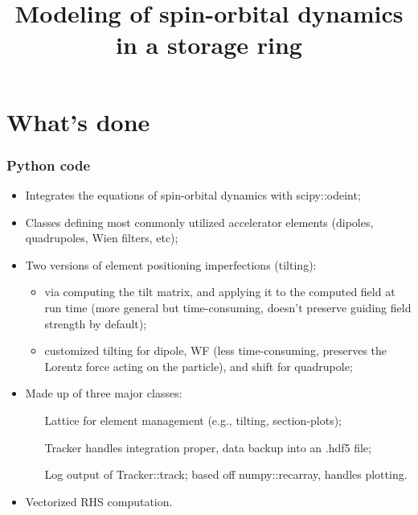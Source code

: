 \documentclass[pdf]{beamer}
\title{Modeling of spin-orbital dynamics in a storage ring}
\begin{document}
	\begin{frame}
		\titlepage
	\end{frame}		
\section{What's done}
	\begin{frame}
		\frametitle{Python code}
		\begin{itemize}
			\item Integrates the equations of spin-orbital dynamics with scipy::odeint;
			\item Classes defining most commonly utilized accelerator elements (dipoles, quadrupoles, Wien filters, etc);
			\item Two versions of element positioning imperfections (tilting):
			\begin{itemize}
				\item via computing the tilt matrix, and applying it to the computed field at run time (more general but time-consuming, doesn't preserve guiding field strength by default);
				\item customized tilting for dipole, WF (less time-consuming, preserves the Lorentz force acting on the particle), and shift for quadrupole;
			\end{itemize}
			\item Made up of three major classes:
			\begin{itemize}
				\item[Lattice] for element management (e.g., tilting, section-plots);
				\item[Tracker] handles integration proper, data backup into an .hdf5 file;
				\item[Log] output of Tracker::track; based off numpy::recarray, handles plotting.
			\end{itemize}
		\item Vectorized RHS computation.
		\end{itemize}
	\end{frame}
\end{document}
